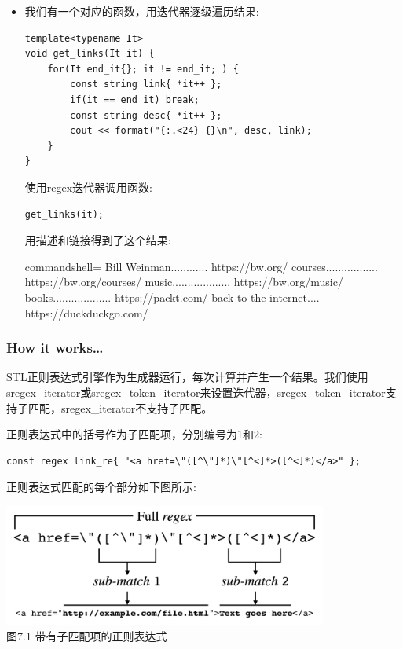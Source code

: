 \begin{itemize}
\item 
我们有一个对应的函数，用迭代器逐级遍历结果:

\begin{lstlisting}[style=styleCXX]
template<typename It>
void get_links(It it) {
	for(It end_it{}; it != end_it; ) {
		const string link{ *it++ };
		if(it == end_it) break;
		const string desc{ *it++ };
		cout << format("{:.<24} {}\n", desc, link);
	}
}
\end{lstlisting}

使用regex迭代器调用函数:

\begin{lstlisting}[style=styleCXX]
get_links(it);
\end{lstlisting}

用描述和链接得到了这个结果:

\begin{tcblisting}{commandshell={}}
Bill Weinman............ https://bw.org/
courses................. https://bw.org/courses/
music................... https://bw.org/music/
books................... https://packt.com/
back to the internet.... https://duckduckgo.com/
\end{tcblisting}
\end{itemize}

\subsubsection{How it works…}

STL正则表达式引擎作为生成器运行，每次计算并产生一个结果。我们使用sregex\_iterator或sregex\_token\_iterator来设置迭代器，sregex\_token\_iterator支持子匹配，sregex\_iterator不支持子匹配。

正则表达式中的括号作为子匹配项，分别编号为1和2:

\begin{lstlisting}[style=styleCXX]
const regex link_re{ "<a href=\"([^\"]*)\"[^<]*>([^<]*)</a>" };
\end{lstlisting}

正则表达式匹配的每个部分如下图所示:

\begin{center}
\includegraphics[width=0.8\textwidth]{content/chapter7/images/1.png}\\
图7.1 带有子匹配项的正则表达式
\end{center}

